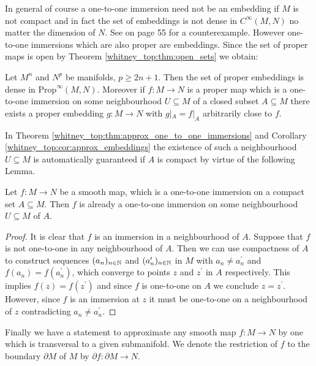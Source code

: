 In general of course a one-to-one immersion need not be an embedding if $M$ is not compact and in fact the set of embeddings is not dense in $C^\infty(M,N)$ no matter the dimension of $N$. See \cite{hirsch2012differential} on page 55 for a counterexample. However one-to-one immersions which are also proper are embeddings. Since the set of proper maps is open by Theorem \ref{whitney_top:thm:open_sets} we obtain:

\begin{corollary}[Embeddings]
    \label{whitney_top:cor:approx_embeddings}
    Let $M^n$ and $N^p$ be manifolds, $p \geq 2n+1$. Then the set of proper embeddings is dense in $\mathrm{Prop}^\infty(M,N)$. Moreover if $f \colon M \to N$ is a proper map which is a one-to-one immersion on some neighbourhood $U \subseteq M$ of a closed subset $A \subseteq M$ there exists a proper embedding $g \colon M \to N$ with $g|_A = f|_A$ arbitrarily close to $f$.
\end{corollary}

In Theorem \ref{whitney_top:thm:approx_one_to_one_immersions} and Corollary \ref{whitney_top:cor:approx_embeddings} the existence of such a neighbourhood $U \subseteq M$ is automatically guaranteed if $A$ is compact by virtue of the following Lemma.

\begin{lemma}
    \label{whitney_top:lem:lemma_for_existence_of_U}
    Let $f \colon M \to N$ be a smooth map, which is a one-to-one immersion on a compact set $A \subseteq M$. Then $f$ is already a one-to-one immersion on some neighbourhood $U \subseteq M$ of $A$. 
\end{lemma}

\begin{proof}
    It is clear that $f$ is an immersion in a neighbourhood of $A$. Suppose that $f$ is not one-to-one in any neighbourhood of $A$. Then we can use compactness of $A$ to construct sequences $(a_n)_{n \in \mathbb{N}}$ and $(a_n^\prime)_{n \in \mathbb{N}}$ in $M$ with $a_n \neq a_n^\prime$ and $f(a_n) = f(a_n^\prime)$, which converge to points $z$ and $z^\prime$ in $A$ respectively. This implies $f(z) = f(z^\prime)$ and since $f$ is one-to-one on $A$ we conclude $z = z^\prime$. However, since $f$ is an immersion at $z$ it must be one-to-one on a neighbourhood of $z$ contradicting $a_n \neq a_n^\prime$.
\end{proof}

Finally we have a statement to approximate any smooth map $f \colon M \to N$ by one which is transversal to a given submanifold. We denote the restriction of $f$ to the boundary $\partial M$ of $M$ by $\partial f \colon \partial M \to N$.

